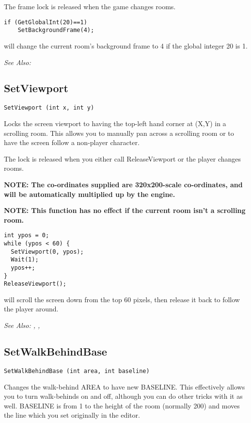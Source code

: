 The frame lock is released when the game changes rooms.

\begin{verbatim}
if (GetGlobalInt(20)==1)
    SetBackgroundFrame(4);
\end{verbatim}
will change the current room's background frame to 4 if the global integer 20 is 1.

\it{See Also:} 


\subsection{SetViewport}\label{SetViewport}%

\begin{verbatim}
SetViewport (int x, int y)
\end{verbatim}
Locks the screen viewport to having the top-left hand corner at (X,Y) in
a scrolling room. This allows you to manually pan across a scrolling room
or to have the screen follow a non-player character.

The lock is released when you either call ReleaseViewport or the player
changes rooms.

\bf{NOTE:} The co-ordinates supplied are 320x200-scale co-ordinates, and will
be automatically multiplied up by the engine.

\bf{NOTE:} This function has no effect if the current room isn't a scrolling room.

\begin{verbatim}
int ypos = 0;
while (ypos < 60) {
  SetViewport(0, ypos);
  Wait(1);
  ypos++;
}
ReleaseViewport();
\end{verbatim}
will scroll the screen down from the top 60 pixels, then release it back
to follow the player around.

\it{See Also:} , , 


\subsection{SetWalkBehindBase}\label{SetWalkBehindBase}%

\begin{verbatim}
SetWalkBehindBase (int area, int baseline)
\end{verbatim}
Changes the walk-behind AREA to have new BASELINE. This effectively allows
you to turn walk-behinds on and off, although you can do other tricks with
it as well. BASELINE is from 1 to the height of the room (normally 200) and
moves the line which you set originally in the editor.

